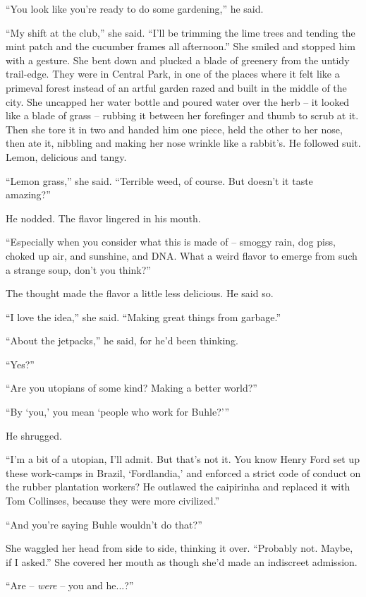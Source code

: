 “You look like you're ready to do some gardening,” he said.

“My shift at the club,” she said. “I'll be trimming the lime 
trees and tending the mint patch and the cucumber frames all 
afternoon.” She smiled and stopped him with a gesture. She bent down 
and plucked a blade of greenery from the untidy trail-edge. They were 
in Central Park, in one of the places where it felt like a primeval 
forest instead of an artful garden razed and built in the middle of the 
city. She uncapped her water bottle and poured water over the herb -- 
it looked like a blade of grass -- rubbing it between her forefinger 
and thumb to scrub at it. Then she tore it in two and handed him one 
piece, held the other to her nose, then ate it, nibbling and making her 
nose wrinkle like a rabbit's. He followed suit. Lemon, delicious and 
tangy.

“Lemon grass,” she said. “Terrible weed, of course. But doesn't 
it taste amazing?”

He nodded. The flavor lingered in his mouth.

“Especially when you consider what this is made of -- smoggy rain, 
dog piss, choked up air, and sunshine, and DNA. What a weird flavor to 
emerge from such a strange soup, don't you think?”

The thought made the flavor a little less delicious. He said so.

“I love the idea,” she said. “Making great things from garbage.”

“About the jetpacks,” he said, for he'd been thinking.

“Yes?”

“Are you utopians of some kind? Making a better world?”

“By `you,' you mean `people who work for Buhle?'”

He shrugged.

“I'm a bit of a utopian, I'll admit. But that's not it. You know 
Henry Ford set up these work-camps in Brazil, `Fordlandia,' and 
enforced a strict code of conduct on the rubber plantation workers? He 
outlawed the caipirinha and replaced it with Tom Collinses, because 
they were more civilized.”

“And you're saying Buhle wouldn't do that?”

She waggled her head from side to side, thinking it over. “Probably 
not. Maybe, if I asked.” She covered her mouth as though she'd made 
an indiscreet admission.

“Are -- \emph{were} -- you and he...?”

